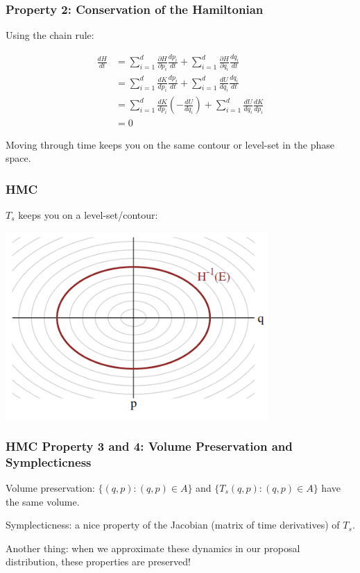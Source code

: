 \documentclass{beamer}
\begin{document}
\begin{frame}
\frametitle{Property 2: Conservation of the Hamiltonian}

Using the chain rule:

\begin{align*}
\frac{d H}{dt} &= \sum_{i=1}^d \frac{\partial H}{\partial p_i}\frac{dp_i}{dt} + \sum_{i=1}^d \frac{\partial H}{\partial q_i}\frac{dq_i}{dt} \\
&= \sum_{i=1}^d \frac{dK}{dp_i}\frac{dp_i}{dt} + \sum_{i=1}^d \frac{dU}{dq_i}\frac{dq_i}{dt} \\
&= \sum_{i=1}^d \frac{dK}{dp_i}\left( - \frac{d U}{dq_i}\right) + \sum_{i=1}^d \frac{dU}{dq_i}\frac{dK}{dp_i} \\
&= 0
\end{align*}

Moving through time keeps you on the same contour or level-set in the phase space.
\end{frame}

\begin{frame}
\frametitle{HMC}

$T_s$ keeps you on a level-set/contour: 
\begin{center}
\includegraphics[width=100mm]{level_sets.png}
\end{center}
\end{frame}

\begin{frame}
\frametitle{HMC Property 3 and 4: Volume Preservation and Symplecticness}

Volume preservation: $\{ (q,p) : (q,p) \in A\}$ and $\{ T_s(q,p) : (q,p) \in A\}$ have the same volume.
\newline

Symplecticness: a nice property of the Jacobian (matrix of time derivatives) of $T_s$.
\newline

Another thing: when we approximate these dynamics in our proposal distribution, these properties are preserved!




\end{frame}
\end{document}

